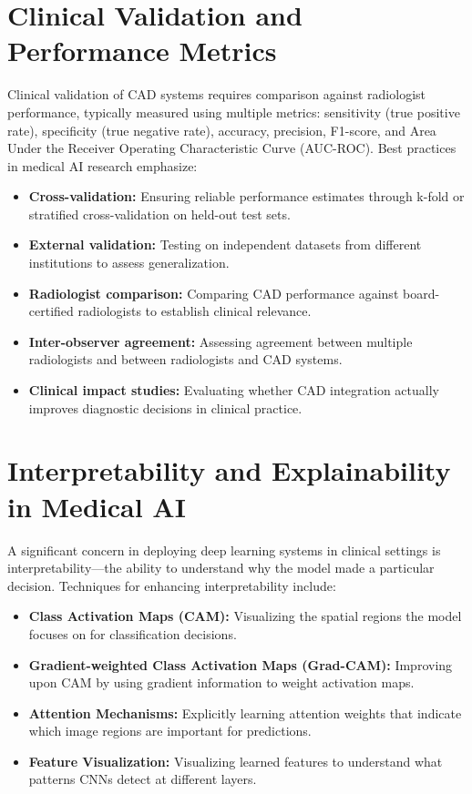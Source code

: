 {\section{Clinical Validation and Performance Metrics}

Clinical validation of CAD systems requires comparison against radiologist performance, typically measured using multiple metrics: sensitivity (true positive rate), specificity (true negative rate), accuracy, precision, F1-score, and Area Under the Receiver Operating Characteristic Curve (AUC-ROC). Best practices in medical AI research emphasize:

\begin{itemize}
    \item \textbf{Cross-validation:} Ensuring reliable performance estimates through k-fold or stratified cross-validation on held-out test sets.
    \item \textbf{External validation:} Testing on independent datasets from different institutions to assess generalization.
    \item \textbf{Radiologist comparison:} Comparing CAD performance against board-certified radiologists to establish clinical relevance.
    \item \textbf{Inter-observer agreement:} Assessing agreement between multiple radiologists and between radiologists and CAD systems.
    \item \textbf{Clinical impact studies:} Evaluating whether CAD integration actually improves diagnostic decisions in clinical practice.
\end{itemize}

\section{Interpretability and Explainability in Medical AI}

A significant concern in deploying deep learning systems in clinical settings is interpretability—the ability to understand why the model made a particular decision. Techniques for enhancing interpretability include:

\begin{itemize}
    \item \textbf{Class Activation Maps (CAM):} Visualizing the spatial regions the model focuses on for classification decisions.
    \item \textbf{Gradient-weighted Class Activation Maps (Grad-CAM):} Improving upon CAM by using gradient information to weight activation maps.
    \item \textbf{Attention Mechanisms:} Explicitly learning attention weights that indicate which image regions are important for predictions.
    \item \textbf{Feature Visualization:} Visualizing learned features to understand what patterns CNNs detect at different layers.
\end{itemize}

}
